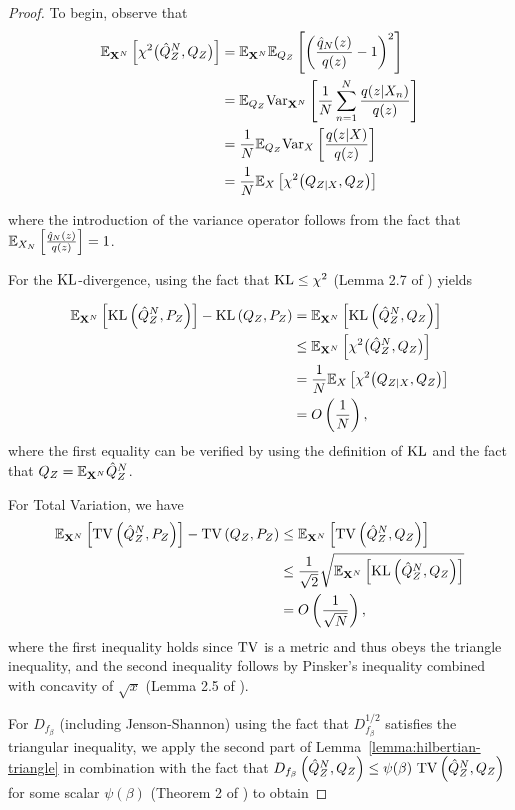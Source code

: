 \begin{proof}
To begin, observe that 
\begin{align*}
    \mathbb{E}_{\mathbf{X}^N}\left[\chi^2\bigl(\hat{Q}^N_Z, Q_Z\bigr)\right]
    &= \mathbb{E}_{\mathbf{X}^N}\mathbb{E}_{Q_Z}\left[\left(\frac{\hat{q}_N(z)}{q(z)} - 1\right)^2 \right]\\
    &=\mathbb{E}_{Q_Z} \text{Var}_{\mathbf{X}^N} \left[ \frac{1}{N} \sum_{n=1}^N\frac{q(z|X_n)}{q(z)}\right] \\
    &= \frac{1}{N} \mathbb{E}_{Q_Z}\text{Var}_X \left[ \frac{q(z|X)}{q(z)} \right]\\
    &= \frac{1}{N}\mathbb{E}_{X}\left[\chi^2\bigl(Q_{Z|X}, Q_Z\bigr) \right]
\end{align*}

where the introduction of the variance operator follows from the fact that $\mathbb{E}_{X_N}\left[ \frac{\hat{q}_N(z)}{q(z)} \right] = 1$.

For the $\mathrm{KL}$-divergence, using the fact that $\mathrm{KL} \leq \chi^2$ (Lemma 2.7 of \cite{tsybakov2009}) yields

\begin{align*}
    \mathbb{E}_{\mathbf{X}^N}\left[\mathrm{KL}\left( \hat{Q}^N_Z , P_Z\right)\right] - \mathrm{KL}\left( Q_{Z} , P_Z\right) &=\mathbb{E}_{\mathbf{X}^N}\left[\mathrm{KL}\left( \hat{Q}^N_Z , Q_Z\right)\right]\\
    &\leq \mathbb{E}_{\mathbf{X}^N}\left[\chi^2\bigl(\hat{Q}^N_Z, Q_Z\bigr) \right]\\
    &= \frac{1}{N}\mathbb{E}_{X}\left[\chi^2\bigl(Q_{Z|X}, Q_Z\bigr)\right]\\
    &=O\left(\frac{1}{N}\right),
\end{align*}
where the first equality can be verified by using the definition of $\mathrm{KL}$ and the fact that $Q_Z = \mathbb{E}_{\mathbf{X}^N}\hat{Q}^N_Z$.

For Total Variation, we have
\begin{align*}
    \mathbb{E}_{\mathbf{X}^N}\left[\mathrm{TV}\left( \hat{Q}^N_Z , P_Z\right)\right] - \mathrm{TV}\left( Q_{Z} , P_Z\right) &\leq\mathbb{E}_{\mathbf{X}^N}\left[\mathrm{TV}\left( \hat{Q}^N_Z , Q_Z\right)\right]\\
    &\leq \frac{1}{\sqrt{2}} \sqrt{\mathbb{E}_{\mathbf{X}^N}\left[\mathrm{KL}\left( \hat{Q}^N_Z , Q_Z\right) \right]}\\
    &=O\left(\frac{1}{\sqrt{N}}\right),
\end{align*}
where the first inequality holds since $\mathrm{TV}$ is a metric and thus obeys the triangle inequality, and the second inequality follows by Pinsker's inequality combined with concavity of $\sqrt{x}$ (Lemma 2.5 of \cite{tsybakov2009}).

For $D_{f_\beta}$ (including Jenson-Shannon) using the fact that $D_{f_\beta}^{1/2}$ satisfies the triangular inequality, we apply the second part of Lemma~\ref{lemma:hilbertian-triangle}
in combination with the fact that
$D_{f_\beta}\left(\hat{Q}^N_Z , Q_Z\right) \leq \psi(\beta) \ \mathrm{TV}\left( \hat{Q}^N_Z , Q_Z \right)$ for some scalar $\psi(\beta)$ (Theorem 2 of \cite{osterreicher2003new}) to obtain


\end{proof}
